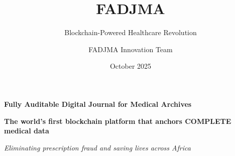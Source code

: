 \documentclass[aspectratio=169,xcolor=dvipsnames,14pt]{beamer}
\title[FADJMA]{FADJMA}
\subtitle{Blockchain-Powered Healthcare Revolution}
\author[Cheikh Modiouf]{FADJMA Innovation Team}
\institute[Hedera Hack Africa]{Hedera Africa Hackathon 2025 \\ Healthcare Operations Track}
\date{October 2025}
\begin{document}
\begin{frame}
  \titlepage

  \begin{center}
    \Large{\textbf{Fully Auditable Digital Journal for Medical Archives}}

    \vspace{0.5cm}

    \large{\textcolor{HederaPurple}{\textbf{The world's first blockchain platform that anchors COMPLETE medical data}}}

    \vspace{0.3cm}

    \textit{Eliminating prescription fraud and saving lives across Africa}

    \vspace{0.5cm}

  \end{center}
\end{frame}
\end{document}
